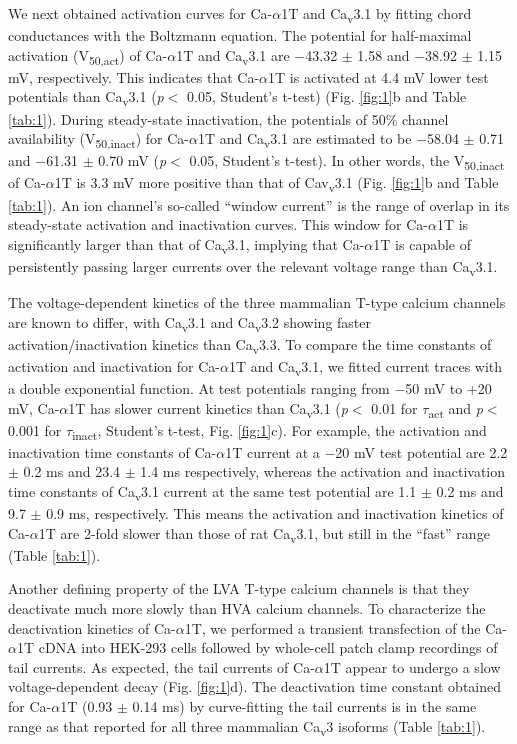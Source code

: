 We next obtained activation curves for Ca-$\alpha$1T and Ca\textsubscript{v}3.1 by fitting chord conductances with the Boltzmann equation. The potential for half-maximal activation (V\textsubscript{50,act}) of Ca-$\alpha$1T and Ca\textsubscript{v}3.1 are $-$43.32 $\pm$ 1.58 and $-$38.92 $\pm$ 1.15 mV, respectively. This indicates that Ca-$\alpha$1T is activated at 4.4 mV lower test potentials than Ca\textsubscript{v}3.1 (\emph{p}$<$ 0.05, Student's t-test) (Fig. \ref{fig:1}b and Table \ref{tab:1}).
During steady-state inactivation, the potentials of 50\% channel availability (V\textsubscript{50,inact}) for Ca-$\alpha$1T and Ca\textsubscript{v}3.1 are estimated to be $-$58.04 $\pm$ 0.71 and $-$61.31 $\pm$ 0.70 mV (\emph{p}$<$ 0.05, Student's t-test). In other words, the V\textsubscript{50,inact} of Ca-$\alpha$1T is 3.3 mV more positive than that of Cav\textsubscript{v}3.1 (Fig. \ref{fig:1}b and Table \ref{tab:1}).
An ion channel's so-called ``window current'' is the range of overlap in its steady-state activation and inactivation curves. This window for Ca-$\alpha$1T is significantly larger than that of Ca\textsubscript{v}3.1, implying that Ca-$\alpha$1T is capable of persistently passing larger currents over the relevant voltage range than Ca\textsubscript{v}3.1.

The voltage-dependent kinetics of the three mammalian T-type calcium channels are known to differ, with Ca\textsubscript{v}3.1 and Ca\textsubscript{v}3.2 showing faster activation/inactivation kinetics than Ca\textsubscript{v}3.3\cite{klockner:1999aa}.
To compare the time constants of activation and inactivation for Ca-$\alpha$1T and Ca\textsubscript{v}3.1, we fitted current traces with a double exponential function.
At test potentials ranging from $-$50 mV to +20 mV,  Ca-$\alpha$1T has slower current kinetics than Ca\textsubscript{v}3.1 (\emph{p}$<$ 0.01 for $\tau$\textsubscript{act} and \emph{p}$<$ 0.001 for $\tau$\textsubscript{inact}, Student's t-test, Fig. \ref{fig:1}c).
For example, the activation and inactivation time constants of Ca-$\alpha$1T current at a $-$20 mV test potential are 2.2 $\pm$ 0.2 ms and 23.4 $\pm$ 1.4 ms respectively, whereas the activation and inactivation time constants of Ca\textsubscript{v}3.1 current at the same test potential are 1.1 $\pm$ 0.2 ms and 9.7 $\pm$ 0.9 ms, respectively. This means the activation and inactivation kinetics of Ca-$\alpha$1T are 2-fold slower than those of rat Ca\textsubscript{v}3.1, but still in the ``fast'' range (Table \ref{tab:1}).

Another defining property of the LVA T-type calcium channels is that they deactivate much more slowly than HVA calcium channels\cite{PerezReyes:1998gn,lee:1999aa,matteson:1986aa}. 
To characterize the deactivation kinetics of Ca-$\alpha$1T, we performed a transient transfection of the Ca-$\alpha$1T cDNA into HEK-293 cells followed by whole-cell patch clamp recordings of tail currents.
As expected, the tail currents of Ca-$\alpha$1T appear to undergo a slow voltage-dependent decay (Fig. \ref{fig:1}d).
The deactivation time constant obtained for Ca-$\alpha$1T (0.93 $\pm$ 0.14 ms) by curve-fitting the tail currents is in the same range as that reported for all three mammalian Ca\textsubscript{v}3 isoforms (Table \ref{tab:1}). 

